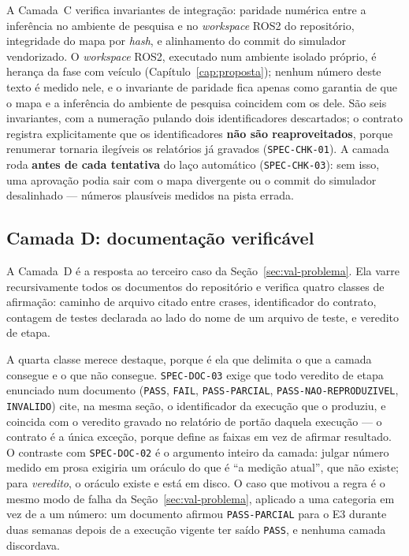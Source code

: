 A Camada~C verifica invariantes de integração: paridade numérica entre a
inferência no ambiente de pesquisa e no \textit{workspace} ROS2 do repositório,
integridade do mapa por \textit{hash}, e alinhamento do commit do simulador
vendorizado. O \textit{workspace} ROS2, executado num ambiente isolado próprio, é
herança da fase com veículo (Capítulo~\ref{cap:proposta}); nenhum número deste
texto é medido nele, e o invariante de paridade fica apenas como garantia de que o
mapa e a inferência do ambiente de pesquisa coincidem com os dele. São seis invariantes, com a
numeração pulando dois identificadores descartados; o contrato registra
explicitamente que os identificadores \textbf{não são reaproveitados}, porque
renumerar tornaria ilegíveis os relatórios já gravados
(\texttt{SPEC-CHK-01}). A camada roda \textbf{antes de cada tentativa} do laço
automático (\texttt{SPEC-CHK-03}): sem isso, uma aprovação podia sair com o mapa
divergente ou o commit do simulador desalinhado --- números
plausíveis medidos na pista errada.

\subsection{Camada D: documentação verificável}

A Camada~D é a resposta ao terceiro caso da Seção~\ref{sec:val-problema}. Ela
varre recursivamente todos os documentos do repositório e verifica quatro
classes de afirmação: caminho de arquivo citado entre crases, identificador do
contrato, contagem de testes declarada ao lado do nome de um arquivo de teste, e
veredito de etapa.

A quarta classe merece destaque, porque é ela que delimita o que a camada
consegue e o que não consegue. \texttt{SPEC-DOC-03} exige que todo veredito de
etapa enunciado num documento (\texttt{PASS}, \texttt{FAIL},
\texttt{PASS-PARCIAL}, \texttt{PASS-NAO-REPRODUZIVEL}, \texttt{INVALIDO}) cite,
na mesma seção, o identificador da execução que o produziu, e coincida com o
veredito gravado no relatório de portão daquela execução --- o contrato é a única
exceção, porque define as faixas em vez de afirmar resultado. O contraste com
\texttt{SPEC-DOC-02} é o argumento inteiro da camada: julgar número medido em
prosa exigiria um oráculo do que é ``a medição atual'', que não existe; para
\textit{veredito}, o oráculo existe e está em disco. O caso que motivou a regra é
o mesmo modo de falha da Seção~\ref{sec:val-problema}, aplicado a uma categoria
em vez de a um número: um documento afirmou \texttt{PASS-PARCIAL} para o E3
durante duas semanas depois de a execução vigente ter saído \texttt{PASS}, e
nenhuma camada discordava.

